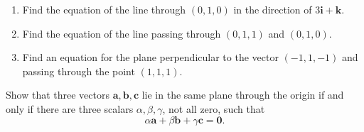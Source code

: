 \documentclass[openany]{book}
\begin{document}
\begin{prob}[4]
    \begin{enumerate}
        \item[(a)] Find the equation of the line through \( (0, 1, 0) \) in the direction of \( 3\mathbf{i} + \mathbf{k} \).  
        \item[(b)] Find the equation of the line passing through \( (0, 1, 1) \) and \( (0, 1, 0) \).  
        \item[(c)] Find an equation for the plane perpendicular to the vector \( (-1, 1, -1) \) and passing through the point \( (1, 1, 1) \).
    \end{enumerate}
\end{prob}



\begin{prob}[12]
    Show that three vectors \( \mathbf{a}, \mathbf{b}, \mathbf{c} \) lie in the same plane through the origin if and only if there are three scalars \( \alpha, \beta, \gamma \), not all zero, such that
    \[
        \alpha \mathbf{a} + \beta \mathbf{b} + \gamma \mathbf{c} = \mathbf{0}.
    \]
\end{prob}
\end{document}
